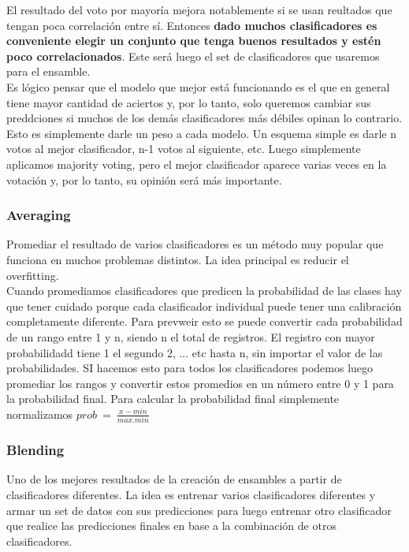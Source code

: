 \documentclass[titlepage,a4paper]{article}
\begin{document}
El resultado del voto por mayoría mejora notablemente si se usan reultados que tengan poca correlación entre sí.  Entonces \textbf{dado muchos clasificadores es conveniente elegir un conjunto que tenga buenos resultados y estén poco correlacionados}. Este será luego el set de clasificadores que usaremos para el ensamble. \\

Es lógico pensar que el modelo que mejor está funcionando es el que en general tiene mayor cantidad de aciertos y, por lo tanto, solo queremos cambiar sus preddciones si muchos de los demás clasificadores más débiles opinan lo contrario. Esto es simplemente darle un peso a cada modelo. Un esquema simple es darle n votos al mejor clasificador, n-1 votos al siguiente, etc. Luego simplemente aplicamos majority voting, pero el mejor clasificador aparece varias veces en la votación y, por lo tanto, su opinión será más importante. \\


\subsubsection*{Averaging}
Promediar el resultado de varios clasificadores es un método muy popular que funciona en muchos problemas distintos. La idea principal es reducir el overfitting. \\

Cuando promediamos clasificadores que predicen la probabilidad de las clases hay que tener cuidado porque cada clasificador individual puede tener una calibración completamente diferente. Para  prevweir esto se puede convertir cada probabilidad de un rango entre 1 y n, siendo n el total de registros. El registro con mayor probabilidadd tiene 1 el segundo 2, ... etc hasta n, sin importar el valor de las probabilidades. SI hacemos esto para todos los clasificadores podemos luego promediar los rangos y convertir estos promedios en un número entre 0 y 1 para la probabilidad final. Para calcular la probabilidad final simplemente normalizamos $prob\ =\  \frac{x-min}{max.min}$\\

\subsubsection*{Blending}
Uno de los mejores resultados de la creación de ensambles a partir de clasificadores diferentes. La idea es entrenar varios clasificadores diferentes y armar un set de datos con sus predicciones para luego entrenar otro clasificador que realice las predicciones finales en base a la combinación de otros clasificadores. \\
\end{document}
